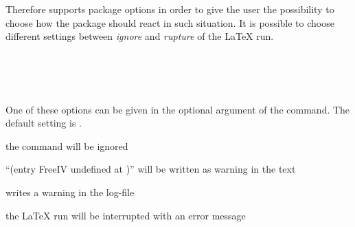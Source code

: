 Therefore  supports package options
in order to give the user the possibility to
choose how the package should react in such situation.
It is possible to choose different settings between
\emph{ignore} and \emph{rupture} of the \LaTeX{} run.

\begin{Declaration}
\\
\\
\\
\end{Declaration}
%
%
One of these options can be given in the optional argument
of the  command. The default setting is
.

\begin{labeling}[\,--]{}
\item[\Option{adrFreeIVempty}] 
        the command  will be ignored
\item[\Option{adrFreeIVshow}] 
        ``(entry FreeIV undefined at )'' will be
        written as warning in the text
\item[\Option{adrFreeIVwarn}]
        writes a warning in the log-file
\item[\Option{adrFreeIVstop}]
        the \LaTeX{} run will be interrupted with an error message
\end{labeling}

